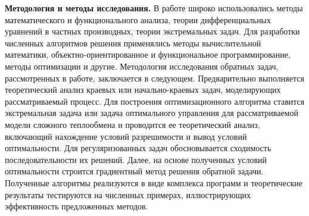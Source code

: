     \textbf{Методология и методы исследования.}
    В работе широко использовались методы математического и функционального анализа,
    теории дифференциальных уравнений в частных производных, теории экстремальных задач.
    Для разработки численных алгоритмов решения применялись методы
    вычислительной математики, объектно-ориентированное и функциональное
    программирование, методы оптимизации и другие.
    Методология исследования обратных задач, рассмотренных в работе,
    заключается в следующем.
    Предварительно выполняется теоретический анализ краевых или начально-краевых задач, моделирующих
    рассматриваемый процесс.
    Для построения оптимизационного алгоритма ставится экстремальная задача или задача
    оптимального управления для рассматриваемой модели сложного теплообмена и проводится ее
    теоретический анализ, включающий нахождение условий разрешимости и
    вывод условий оптимальности.
    Для регуляризованных задач обосновывается
    сходимость последовательности их решений.
    Далее, на основе полученных условий оптимальности
    строится градиентный метод решения обратной задачи.
    Полученные алгоритмы реализуются в виде комплекса программ и
    теоретические результаты тестируются на численных примерах,
    иллюстрирующих эффективность предложенных методов.



